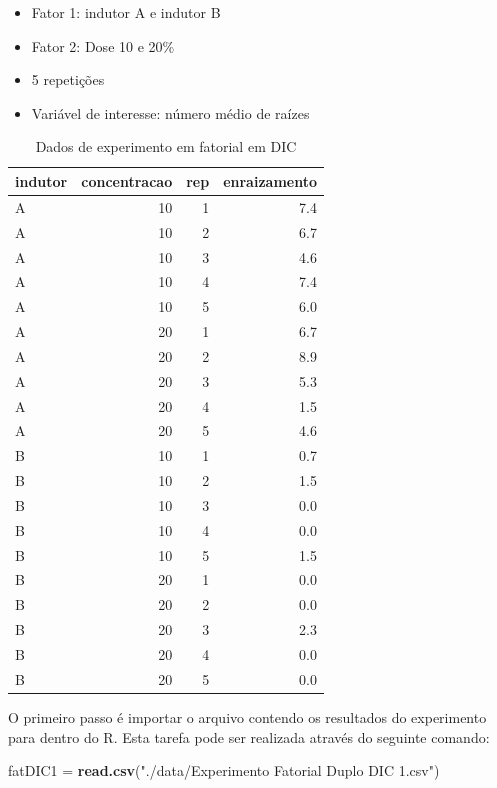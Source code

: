 \documentclass[
]{article}
\newenvironment{Shaded}{\begin{snugshade}}{\end{snugshade}}
\newcommand{\KeywordTok}[1]{\textcolor[rgb]{0.13,0.29,0.53}{\textbf{#1}}}
\newcommand{\NormalTok}[1]{#1}
\newcommand{\StringTok}[1]{\textcolor[rgb]{0.31,0.60,0.02}{#1}}
\providecommand{\tightlist}{%
  \setlength{\itemsep}{0pt}\setlength{\parskip}{0pt}}
\begin{document}
\begin{itemize}
\tightlist
\item
  Fator 1: indutor A e indutor B
\item
  Fator 2: Dose 10 e 20\%
\item
  5 repetições
\item
  Variável de interesse: número médio de raízes
\end{itemize}

\begin{table}

\caption{\label{tab:unnamed-chunk-82}Dados de experimento em fatorial em DIC}
\centering
\begin{tabular}[t]{l|r|r|r}
\hline
indutor & concentracao & rep & enraizamento\\
\hline
A & 10 & 1 & 7.4\\
\hline
A & 10 & 2 & 6.7\\
\hline
A & 10 & 3 & 4.6\\
\hline
A & 10 & 4 & 7.4\\
\hline
A & 10 & 5 & 6.0\\
\hline
A & 20 & 1 & 6.7\\
\hline
A & 20 & 2 & 8.9\\
\hline
A & 20 & 3 & 5.3\\
\hline
A & 20 & 4 & 1.5\\
\hline
A & 20 & 5 & 4.6\\
\hline
B & 10 & 1 & 0.7\\
\hline
B & 10 & 2 & 1.5\\
\hline
B & 10 & 3 & 0.0\\
\hline
B & 10 & 4 & 0.0\\
\hline
B & 10 & 5 & 1.5\\
\hline
B & 20 & 1 & 0.0\\
\hline
B & 20 & 2 & 0.0\\
\hline
B & 20 & 3 & 2.3\\
\hline
B & 20 & 4 & 0.0\\
\hline
B & 20 & 5 & 0.0\\
\hline
\end{tabular}
\end{table}

O primeiro passo é importar o arquivo contendo os resultados do experimento para dentro do R. Esta tarefa pode ser realizada através do seguinte comando:

\begin{Shaded}
\begin{Highlighting}[]
\NormalTok{fatDIC1 =}\StringTok{ }\KeywordTok{read.csv}\NormalTok{(}\StringTok{"./data/Experimento Fatorial Duplo DIC 1.csv"}\NormalTok{)}
\end{Highlighting}
\end{Shaded}
\end{document}
